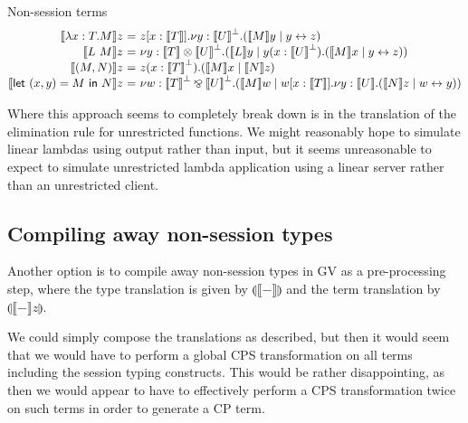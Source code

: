 \documentclass{easychair}
\makeatletter
\newcommand{\ba}{\begin{array}}
\newcommand{\ea}{\end{array}}
\newenvironment{equations}{\[\ba{@{}r@{~}c@{~}l@{}}}{\ea\]}
\newcommand{\key}{\mathsf}
\newcommand{\gvtocp}[1]{\llbracket{#1}\rrbracket}
\newcommand{\cptogv}[1]{\llparenthesis{#1}\rrparenthesis}
\newcommand{\gvPair}[2]{({#1},{#2})}
\newcommand{\gvLet}[3]{\key{let}~{#1}={#2}~\key{in}~{#3}}
\newcommand{\cpLink}[2]{{#1} \leftrightarrow {#2}}
\newcommand{\cpCut}[3]{\nu {#1}.({#2} \mid {#3})}
\newcommand{\cpInput}[3]{{#1}({#2}).{#3}}
\newcommand{\cpTimes}[2]{{#1} \otimes {#2}}
\newcommand{\cpPar}[2]{{#1} \mathbin{\bindnasrepma} {#2}}
\newcommand{\cpDual}[1]{{#1}^\bot}
\newcommand{\gvtocpd}[1]{\gvtocp{#1}}
\newcommand{\cpMix}[2]{({#1} \mid {#2})}
\newcommand{\cpCutOutput}[5]{{#2}[{#3}].\nu{#1}.\cpMix{#4}{#5}}
\makeatother
\begin{document}
Non-session terms
\begin{equations}
\gvtocpd{\lambda x:T.M}z &=&
  \cpCutOutput{y:{\cpDual{\gvtocpd{U}}}}{z}{x:{\gvtocpd{T}}}
              {\gvtocpd{M}y}{\cpLink{y}{z}} \\
\gvtocpd{L~M}z &=&
  \cpCut{y:\cpTimes{\gvtocpd{T}}{\cpDual{\gvtocpd{U}}}}
        {\gvtocpd{L}y}
        {\cpInput{y}{x:\cpDual{\gvtocpd{U}}}{\cpMix{\gvtocpd{M}x}{\cpLink{y}{z}}}} \\
\gvtocpd{\gvPair{M}{N}}z &=&
  \cpInput{z}{x:\cpDual{\gvtocpd{T}}}{\cpMix{\gvtocpd{M}x}{\gvtocpd{N}z}} \\
\gvtocpd{\gvLet{\gvPair{x}{y}}{M}{N}}z &=&
  \cpCut{w:\cpPar{\cpDual{\gvtocpd{T}}}{\cpDual{\gvtocpd{U}}}}
    {\gvtocpd{M}w}
    {\cpCutOutput{y:\gvtocpd{U}}{w}{x:\gvtocpd{T}}{\gvtocpd{N}z}{\cpLink{w}{y}}} \\
\end{equations}

Where this approach seems to completely break down is in the
translation of the elimination rule for unrestricted functions. We
might reasonably hope to simulate linear lambdas using output rather
than input, but it seems unreasonable to expect to simulate
unrestricted lambda application using a linear server rather than an
unrestricted client.

\subsection{Compiling away non-session types}

Another option is to compile away non-session types in GV as a
pre-processing step, where the type translation is given by
$\cptogv{\gvtocp{-}}$ and the term translation by
$\cptogv{\gvtocp{-}z}$.



We could simply compose the translations as described, but then it
would seem that we would have to perform a global CPS transformation
on all terms including the session typing constructs. This would be
rather disappointing, as then we would appear to have to effectively
perform a CPS transformation twice on such terms in order to generate
a CP term.
\end{document}
